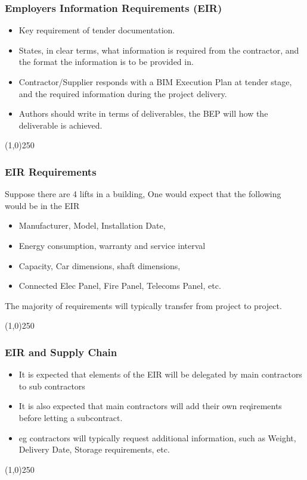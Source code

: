 \begin{frame}
\frametitle{Employers Information Requirements (EIR)}
\begin{itemize}
	\item Key requirement of tender documentation.
	\item States, in clear terms, what information is required from the contractor, and the format the information is to be provided in.
	\item Contractor/Supplier responds with a BIM Execution Plan at tender stage, and the required information during the project delivery.
	\item Authors should write in terms of deliverables, the BEP will how the deliverable is achieved.
\end{itemize}
\end{frame}
\begin{center}\line(1,0){250}\end{center}



\begin{frame}
\frametitle{EIR Requirements}
Suppose there are 4 lifts in a building, One would expect that the following would be in the EIR
\begin{itemize}
	\item Manufacturer, Model, Installation Date,
	\item Energy consumption, warranty and service interval
	\item Capacity, Car dimensions, shaft dimensions,
	\item Connected Elec Panel, Fire Panel, Telecoms Panel, etc. 
\end{itemize}
The majority of requirements will typically transfer from project to project.
\end{frame}
\begin{center}\line(1,0){250}\end{center}



\begin{frame}
\frametitle{EIR and Supply Chain}
\begin{itemize}
	\item It is expected that elements of the EIR will be delegated by main contractors to sub contractors
	\item It is also expected that main contractors will add their own reqirements before letting a subcontract.
	\item eg contractors will typically request additional information, such as Weight, Delivery Date, Storage requirements, etc.
\end{itemize}
\end{frame}
\begin{center}\line(1,0){250}\end{center}


